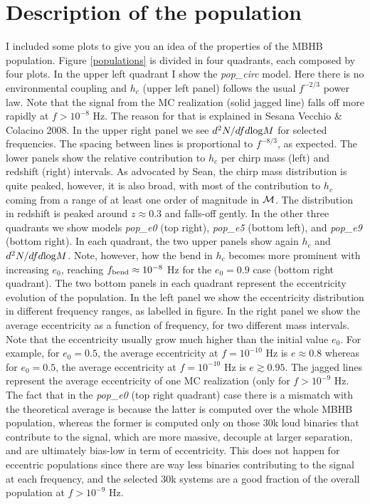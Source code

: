 \documentclass[prd,aps,eqsecnum]{revtex4}
\begin{document}
\section{Description of the population}
I included some plots to give you an idea of the properties of the MBHB population. Figure \ref{populations} is divided in four quadrants, each composed by four plots. In the upper left quadrant I show the {\it pop\_circ} model. Here there is no environmental coupling and $h_c$ (upper left panel) follows the usual $f^{-2/3}$ power law. Note that the signal from the MC realization (solid jagged line) falls off more rapidly at $f>10^{-8}$ Hz. The reason for that is explained in Sesana Vecchio \& Colacino 2008. In the upper right panel we see $d^2N/dfd{\rm log}M$ for selected frequencies. The spacing between lines is proportional to $f^{-8/3}$, as expected. The lower panels show the relative contribution to $h_c$ per chirp mass (left) and redshift (right) intervals. As advocated by Sean, the chirp mass distribution is quite peaked, however, it is also broad, with most of the contribution to $h_c$ coming from a range of at least one order of magnitude in ${\cal M}$. The distribution in redshift is peaked around $z\approx0.3$ and falls-off gently. In the other three quadrants we show models {\it pop\_e0} (top right), {\it pop\_e5} (bottom left), and {\it pop\_e9} (bottom right). In each quadrant, the two upper panels show again $h_c$ and $d^2N/dfd{\rm log}M$. Note, however, how the bend in $h_c$ becomes more prominent with increasing $e_0$, reaching $f_{\rm bend}\approx10^{-8}$ Hz for the $e_0=0.9$ case (bottom right quadrant). The two bottom panels in each quadrant represent the eccentricity evolution of the population. In the left panel we show the eccentricity distribution in different frequency ranges, as labelled in figure. In the right panel we show the average eccentricity as a function of frequency, for two different mass intervals. Note that the eccentricity usually grow much higher than the initial value $e_0$. For example, for $e_0=0.5$, the average eccentricity at $f=10^{-10}$ Hz is $e\approx0.8$ whereas for $e_0=0.5$, the average eccentricity at $f=10^{-10}$ Hz is $e\gtrsim0.95$. The jagged lines represent the average eccentricity of one MC realization (only for $f>10^{-9}$ Hz. The fact that in the {\it pop\_e0} (top right quadrant) case there is a mismatch with the theoretical average is because the latter is computed over the whole MBHB population, whereas the former is computed only on those 30k loud binaries that contribute to the signal, which are more massive, decouple at larger separation, and are ultimately bias-low in term of eccentricity. This does not happen for eccentric populations since there are way less binaries contributing to the signal at each frequency, and the selected 30k systems are a good fraction of the overall population at $f>10^{-9}$ Hz.
\end{document}
